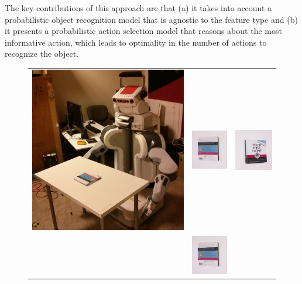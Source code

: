 The key contributions of this approach are that (a) it takes into account a probabilistic object recognition model that is agnostic to the feature type and (b) it presents a probabilistic action selection model that reasons about the most informative action, which leads to optimality in the number of actions to recognize the object.



    \setlength{\tabcolsep}{0.1em}
    \begin{figure}[ht]
    \begin{tabular}{cccc}
    \multicolumn{2}{c}{\multirow{-5}{*}{\includegraphics[width=0.46\columnwidth]{pics/pr2_init.jpg}}} & \includegraphics[width=0.23\columnwidth]{pics/first_back.jpg} 
    &\includegraphics[width=0.23\columnwidth]{pics/first_cover1.jpg} \\
    \multicolumn{2}{c}{} & \includegraphics[width=0.23\columnwidth]{pics/first_back.jpg} 

\end{tabular}
\end{figure}
